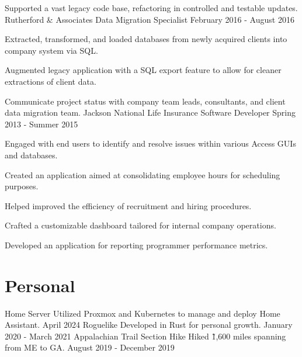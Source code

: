 \documentclass{marvinkassabian_resume}
\begin{document}
				\item Supported a vast legacy code base, refactoring in controlled and testable updates.
			\resumesublistend
		\subsectionpositiondate
				{Rutherford \& Associates}
				{Data Migration Specialist}
				{February 2016 - August 2016}
			\resumesublistbegin
				\item Extracted, transformed, and loaded databases from newly acquired clients into company system via SQL.
				\item Augmented legacy \cpp application with a SQL export feature to allow for cleaner extractions of client data.
				\item Communicate project status with company team leads, consultants, and client data migration team.
			\resumesublistend
		\subsectionpositiondate
				{Jackson National Life Insurance}
				{Software Developer}
				{Spring 2013 - Summer 2015}
			\resumesublistbegin
				\item Engaged with end users to identify and resolve issues within various Access GUIs and databases.
				\item Created an application aimed at consolidating employee hours for scheduling purposes.
				\item Helped improved the efficiency of recruitment and hiring procedures.
				\item Crafted a customizable dashboard tailored for internal company operations.
				\item Developed an application for reporting programmer performance metrics.
			\resumesublistend
	\section{Personal}
		\subsectionlocationdate
				{Home Server}
				{Utilized Proxmox and Kubernetes to manage and deploy Home Assistant.}
				{April 2024}
		\subsectionlocationdate
				{Roguelike}
				{Developed in Rust for personal growth.}
				{January 2020 - March 2021}
		\subsectionlocationdate
				{Appalachian Trail Section Hike}
				{Hiked \~1,600 miles spanning from ME to GA.}
				{August 2019 - December 2019}
\end{document}
